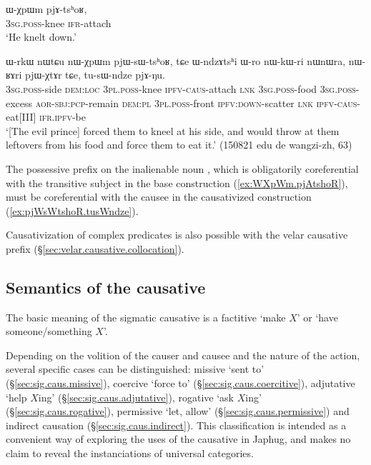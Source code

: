 \begin{exe}
\ex \label{ex:WXpWm.pjAtshoR}
\gll ɯ-χpɯm pjɤ-tsʰoʁ, \\
\textsc{3sg}.\textsc{poss}-knee \textsc{ifr}-attach \\
\glt `He knelt down.'
\end{exe}

\begin{exe}
\ex \label{ex:pjWsWtshoR.tusWndze}
\gll ɯ-rkɯ nɯtɕu nɯ-χpɯm pjɯ-sɯ-tsʰoʁ, tɕe ɯ-ndzɤtsʰi ɯ-ro nɯ-kɯ-ri nɯnɯra, 
nɯ-ʁɤri pjɯ-χtɤr tɕe, tu-sɯ-ndze pjɤ-ŋu. \\
\textsc{3sg}.\textsc{poss}-side \textsc{dem}:\textsc{loc} \textsc{3pl}.\textsc{poss}-knee \textsc{ipfv}-\textsc{caus}-attach \textsc{lnk} \textsc{3sg}.\textsc{poss}-food \textsc{3sg}.\textsc{poss}-excess \textsc{aor}-\textsc{sbj}:\textsc{pcp}-remain \textsc{dem}:\textsc{pl} \textsc{3pl}.\textsc{poss}-front \textsc{ipfv}:\textsc{down}-scatter \textsc{lnk} \textsc{ipfv}-\textsc{caus}-eat[III] \textsc{ifr}.\textsc{ipfv}-be \\
\glt `[The evil prince] forced them to kneel at his side, and would throw at them leftovers from his food and force them to eat it.' (150821 edu de wangzi-zh, 63)
\end{exe}

The possessive prefix on the inalienable noun , which is obligatorily coreferential with the transitive subject in the base construction (\ref{ex:WXpWm.pjAtshoR}), must be coreferential with the causee in the causativized construction (\ref{ex:pjWsWtshoR.tusWndze}).

Causativization of complex predicates is also possible with the velar causative prefix (§\ref{sec:velar.causative.collocation}).

\subsection{Semantics of the causative} \label{sec:sig.caus.function}
The basic meaning of the sigmatic causative is a factitive `make $X$' or `have someone/something $X$'. 

Depending on the volition of the causer and causee and the nature of the action, several specific cases can be distinguished: missive `sent to' (§\ref{sec:sig.caus.missive}), coercive `force to' (§\ref{sec:sig.caus.coercitive}), adjutative `help $X$ing' (§\ref{sec:sig.caus.adjutative}), rogative `ask $X$ing' (§\ref{sec:sig.caus.rogative}), permissive `let, allow' (§\ref{sec:sig.caus.permissive}) and indirect causation (§\ref{sec:sig.caus.indirect}). This classification is intended as a convenient way of exploring the uses of the causative in Japhug, and makes no claim to reveal the instanciations of universal categories.

